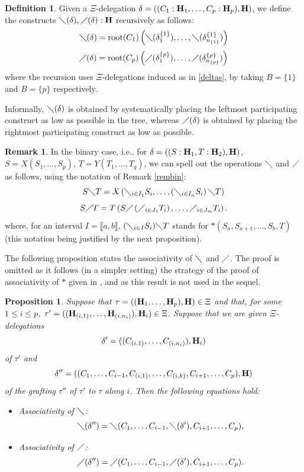 \documentclass{article}
\theoremstyle{plain}
\newtheorem{prop}[thm]{Proposition}
\theoremstyle{definition}
\newtheorem{definition}[thm]{Definition}
\newtheorem{remark}[thm]{Remark}
\newcommand{\set}[1]{\{#1\}}
\newcommand{\hyper}[1]{{\bf #1}}
\begin{document}
\begin{definition} 
Given a $\Xi$-delegation $\delta=((C_1:{\bf H}_1,\dots, C_p:{\bf H}_p),{\bf H})$, we define the constructs $\diagdown (\delta),\diagup (\delta):{\bf H}$ recursively as follows:
$$
 \diagdown (\delta) = \operatorname{root}(C_1) \left(\diagdown(\delta^{\{1\}}_1), \ldots, \diagdown (\delta^{\{1\}}_{n_{\set{1}}}) \right)
$$
$$
 \diagup (\delta) = \operatorname{root}(C_p) \left(\diagup(\delta^{\{p\}}_1), \ldots, \diagup (\delta^{\{p\}}_{n_{\set{p}}}) \right)
$$
where the recursion uses $\Xi$-delegations induced as in \eqref{deltas}, by taking $B=\{1\}$ and $B=\{p\}$ respectively.
\end{definition}
Informally, $\diagdown (\delta)$ is obtained by systematically placing
the leftmost participating construct as low as possible in the tree,
whereas $\diagup(\delta)$ is obtained by placing the rightmost
participating construct as low as possible.

\begin{remark} In the binary case, i.e., for $\delta=((S:\hyper{H}_1, T:\hyper{H}_2), \hyper{H})$, $S=X(S_1, \ldots , S_p)$, $T=Y(T_1,\ldots, T_q)$, we can spell out the operations $\diagdown$ and $\diagup$ as follows, using the notation of Remark \ref{rembin}:
$$
 S \diagdown T = X\left(\diagdown_{i \in I_1} S_i, \ldots,\left( \diagdown_{i \in I_n} S_i \right) \diagdown T\right)
$$
$$
 S \diagup T = T\left( S \diagup \left(\diagup_{i \in J_1} T_{i} \right),\ldots, \diagup_{i \in J_m} T_i \right).
$$ where, for an interval $I=\llbracket a,b\rrbracket$, $(\diagdown_{i\in I} S_i)\diagdown T$ stands for $\ast(S_a,S_{a+1},\ldots,S_b,T)$ (this notation being justified by the next proposition).
\end{remark}

 
The following proposition states the associativity of $\diagdown$ and $\diagup$. The proof is omitted as 
it follows (in a simpler setting) the strategy of the proof of associativity of $\ast$ given in \cite{PLBJ1}, and as this result is not used in the sequel.

\begin{prop} \label{associativity-diag}
 Suppose that $\tau = ((\hyper{H}_1,\dots,\hyper{H}_p),\hyper{H})\in \Xi$ and that, for some $1\leq i\leq p$, $\tau'= (({\bf{H}}_{(i,1)},\dots, {\bf{H}}_{(i,n_i)}),\hyper{H}_{i})\in\Xi$. Suppose that 
 we are given $\Xi$-delegations $$\delta'=((C_{(i,1)},\dots,C_{(i,n_i)}),{\bf H}_i)$$ of $\tau'$ and $$\delta''=((C_1,\dots,C_{i-1},C_{(i,1)},\dots,C_{(i,k)},C_{i+1},\dots,C_p),{\bf H})$$ of the grafting $\tau''$ of $\tau'$ to $\tau$ along $i$.
Then the following equations hold:
\begin{itemize}
 \item Associativity of $\diagdown$:
$$
 \diagdown(\delta'') = 
\diagdown( C_1,\dots,C_{i-1},\diagdown(\delta'),C_{i+1},\dots,C_p ),
 $$
 \item Associativity of $\diagup$:
 $$
 \diagup(\delta'')=
\diagup( C_1,\dots,C_{i-1},\diagup(\delta'),C_{i+1},\dots,C_p).
$$
 \end{itemize}
\end{prop}
\end{document}
